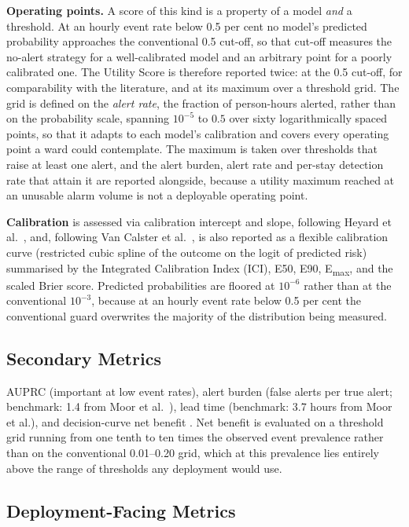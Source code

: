 \textbf{Operating points.} A score of this kind is a property of a model
\emph{and} a threshold. At an hourly event rate below 0.5 per cent no model's
predicted probability approaches the conventional 0.5 cut-off, so that cut-off
measures the no-alert strategy for a well-calibrated model and an arbitrary
point for a poorly calibrated one. The Utility Score is therefore reported
twice: at the 0.5 cut-off, for comparability with the literature, and at its
maximum over a threshold grid. The grid is defined on the \emph{alert rate}, the fraction of person-hours alerted, rather than on the probability scale,
spanning $10^{-5}$ to $0.5$ over sixty logarithmically spaced points, so that
it adapts to each model's calibration and covers every operating point a ward
could contemplate. The maximum is taken over thresholds that raise at least one
alert, and the alert burden, alert rate and per-stay detection rate that attain
it are reported alongside, because a utility maximum reached at an unusable
alarm volume is not a deployable operating point.

\textbf{Calibration} is assessed via calibration intercept and slope, following
Heyard et al.\ \cite{heyard2020evaluation}, and, following Van Calster et al.\
\cite{vancalster2019calibration}, is also reported as a flexible
calibration curve (restricted cubic spline of the outcome on the logit of
predicted risk) summarised by the Integrated Calibration Index (ICI), E50, E90,
E\textsubscript{max}, and the scaled Brier score. Predicted probabilities are
floored at $10^{-6}$ rather than at the conventional $10^{-3}$, because at an
hourly event rate below 0.5 per cent the conventional guard overwrites the
majority of the distribution being measured.

\subsection{Secondary Metrics}

AUPRC (important at low event rates), alert burden (false alerts per true alert;
benchmark: 1.4 from Moor et al.\ \cite{moor2023review}), lead time
(benchmark: 3.7 hours from Moor et al.), and decision-curve net benefit
\cite{vickers2006dca}. Net benefit is evaluated on a threshold grid running
from one tenth to ten times the observed event prevalence rather than on the
conventional 0.01--0.20 grid, which at this prevalence lies entirely above the
range of thresholds any deployment would use.

\subsection{Deployment-Facing Metrics}
\label{sec:deployment_metrics}

